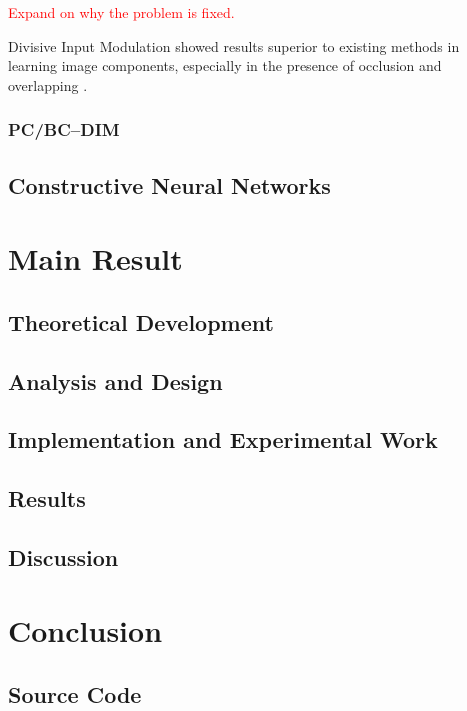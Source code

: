 \documentclass[11pt,a4paper]{report}
\begin{document}
			\textcolor{red}{Expand on why the problem is fixed.}
			
			Divisive Input Modulation showed results superior to existing methods in learning image components, especially in the presence of occlusion and overlapping \cite{spratling2009unsupervised}.
			
			\subsection{PC/BC--DIM}
			
		\section{Constructive Neural Networks}
		\label{sec:constructive}

	
	\chapter{Main Result}
		\section{Theoretical Development}
		\section{Analysis and Design}
		\section{Implementation and Experimental Work}
		\section{Results}
		\section{Discussion}
		
	\chapter{Conclusion}
	
	
	
	\nocite{*}
	
	\begin{appendices}
		\chapter{Source Code}
	\end{appendices}
\end{document}
